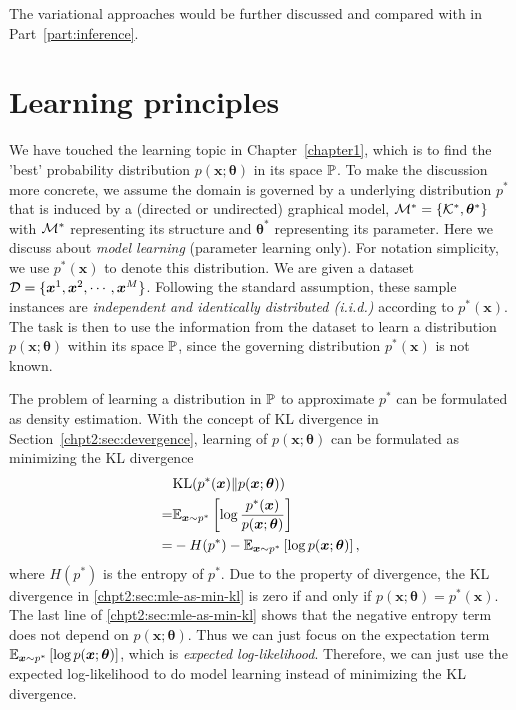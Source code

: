 The variational approaches would be further discussed and compared with in Part~\ref{part:inference}.

\section{Learning principles}
\label{chpt2:sec:learning-principles}
We have touched the learning topic in Chapter~\ref{chapter1}, which is to find the 'best' probability distribution $p(\bm{x}; \bm{\theta})$ in its space $\mathbb{P}$. To make the discussion more concrete, we assume the domain is governed by a underlying distribution $p^{\ast}$ that is induced by a (directed or undirected) graphical model, $\mathcal{M}^{\ast} = \left\{ \mathcal{K}^{\ast}, \bm{\theta}^{\ast} \right\}$ with $\mathcal{M}^{\ast}$ representing its structure and $\bm{\theta}^{\ast}$ representing its parameter. Here we discuss about \textit{model learning} (parameter learning only). For notation simplicity, we use $p^{\ast}(\bm{x})$ to denote this distribution. We are given a dataset $\mathcal{D} = \{\bm{x}^{1}, \bm{x}^{2}, \cdots, \bm{x}^{M}\}$. Following the standard assumption, these sample instances are \textit{independent and identically distributed (i.i.d.)} according to $p^{\ast}(\bm{x})$. The task is then to use the information from the dataset to learn a distribution $p(\bm{x};\bm{\theta})$ within its space $\mathbb{P}$, since the governing distribution $p^{\ast}(\bm{x})$ is not known.

The problem of learning a distribution in $\mathbb{P}$ to approximate $p^{\ast}$ can be formulated as density estimation. With the concept of KL divergence in Section~\ref{chpt2:sec:devergence}, learning of $p(\bm{x};\bm{\theta})$ can be formulated as minimizing the KL divergence
\begin{align}\label{chpt2:sec:mle-as-min-kl}
  &\mathrm{KL}(p^{\ast}(\bm{x})\|p(\bm{x}; \bm{\theta})) \nonumber \\
  =& \mathbb{E}_{\bm{x} \sim p^{\ast}}\left[ \log{\frac{p^{\ast}(\bm{x})}{p(\bm{x}; \bm{\theta})}} \right] \nonumber \\
  =& - H(p^{\ast}) - \mathbb{E}_{\bm{x} \sim p^{\ast}}\left[ \log{{p(\bm{x}; \bm{\theta})}} \right],
\end{align}
where $H(p^{\ast})$ is the entropy of $p^{\ast}$.
Due to the property of divergence, the KL divergence in \eqref{chpt2:sec:mle-as-min-kl} is zero if and only if $p(\bm{x};\bm{\theta})=p^{\ast}(\bm{x})$. The last line of \eqref{chpt2:sec:mle-as-min-kl} shows that the negative entropy term does not depend on $p(\bm{x}; \bm{\theta})$. Thus we can just focus on the expectation term $\mathbb{E}_{\bm{x} \sim p^{\ast}}\left[ \log{{p(\bm{x}; \bm{\theta})}} \right]$, which is \textit{expected log-likelihood}. Therefore, we can just use the expected log-likelihood to do model learning instead of minimizing the KL divergence.

